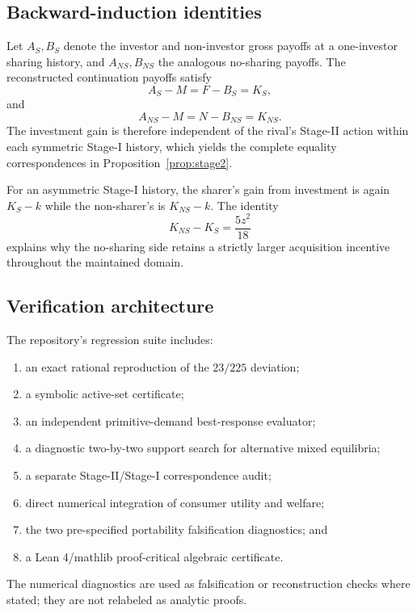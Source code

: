 \subsection{Backward-induction identities}

Let \(A_S,B_S\) denote the investor and non-investor gross payoffs at a one-investor sharing history, and \(A_{NS},B_{NS}\) the analogous no-sharing payoffs.  The reconstructed continuation payoffs satisfy
\[
A_S-M=F-B_S=K_S,
\]
and
\[
A_{NS}-M=N-B_{NS}=K_{NS}.
\]
The investment gain is therefore independent of the rival's Stage-II action within each symmetric Stage-I history, which yields the complete equality correspondences in Proposition~\ref{prop:stage2}.

For an asymmetric Stage-I history, the sharer's gain from investment is again \(K_S-k\) while the non-sharer's is \(K_{NS}-k\).  The identity
\[
K_{NS}-K_S=\frac{5z^2}{18}
\]
explains why the no-sharing side retains a strictly larger acquisition incentive throughout the maintained domain.

\subsection{Verification architecture}

The repository's regression suite includes:
\begin{enumerate}
\item an exact rational reproduction of the \(23/225\) deviation;
\item a symbolic active-set certificate;
\item an independent primitive-demand best-response evaluator;
\item a diagnostic two-by-two support search for alternative mixed equilibria;
\item a separate Stage-II/Stage-I correspondence audit;
\item direct numerical integration of consumer utility and welfare;
\item the two pre-specified portability falsification diagnostics; and
\item a Lean 4/mathlib proof-critical algebraic certificate.
\end{enumerate}
The numerical diagnostics are used as falsification or reconstruction checks where stated; they are not relabeled as analytic proofs.
